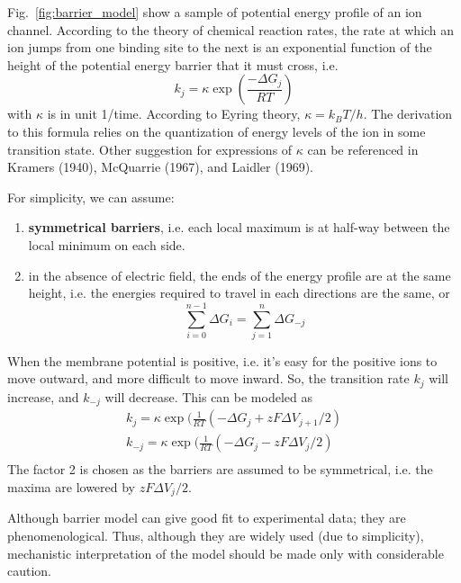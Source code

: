 Fig.~\ref{fig:barrier_model} show a sample of potential energy profile
of an ion channel. According to the theory of chemical reaction rates,
the rate at which an ion jumps from one binding site to the next is an
exponential function of the height of the potential energy barrier
that it must cross, i.e.
\begin{equation}
  \label{eq:1385}
  k_j=\kappa \exp(\frac{-\Delta G_j}{RT})
\end{equation}
with $\kappa$ is in unit 1/time. According to Eyring theory,
$\kappa=k_BT/h$. The derivation to this formula relies on the
quantization of energy levels of the ion in some transition
state. Other suggestion for expressions of $\kappa$ can be referenced
in Kramers (1940), McQuarrie (1967), and Laidler (1969).

For simplicity, we can assume:
\begin{enumerate}
\item {\bf symmetrical barriers}, i.e. each local maximum is at
  half-way between the local minimum on each side.
\item in the absence of electric field, the ends of the energy profile
  are at the same height, i.e. the energies required to travel in each
  directions are the same, or
  \begin{equation}
    \label{eq:1391}
    \sum^{n-1}_{i=0}\Delta G_i = \sum^n_{j=1}\Delta G_{-j}
  \end{equation}
\end{enumerate}
When the membrane potential is positive, i.e. it's easy for the
positive ions to move outward, and more difficult to move inward. So,
the transition rate $k_j$ will increase, and $k_{-j}$ will
decrease. This can be modeled as
\begin{equation}
  \label{eq:1392}
  \begin{split}
    k_j=\kappa \exp(\frac{1}{RT}(-\Delta G_j+zF\Delta V_{j+1}/2)\\
    k_{-j}=\kappa \exp(\frac{1}{RT}(-\Delta G_j-zF\Delta V_{j}/2)\\
  \end{split}
\end{equation}
The factor 2 is chosen as the barriers are assumed to be symmetrical,
i.e. the maxima are lowered by $zF\Delta V_j/2$.

\begin{framed}
  Although barrier model can give good fit to experimental data; they
  are phenomenological. Thus, although they are widely used (due to
  simplicity), mechanistic interpretation of the model should be made
  only with considerable caution.
\end{framed}

